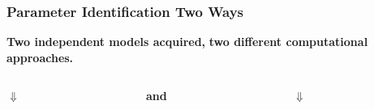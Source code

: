    


		
		
\begin{frame}
    \frametitle{Parameter Identification Two Ways}
    \textbf{Two independent models acquired,}\newline
    \textbf{two different computational approaches.}
    \vspace{1cm}
    \begin{columns}[onlytextwidth]
        \begin{column}{0.4\textwidth}
            \begin{block}{}
            \end{block}
            
            \centering
            $\Downarrow$
            
            \begin{block}{}
            \end{block}
        \end{column}
        
        \begin{column}{0.065\textwidth}
        \textbf{and}
        \end{column}
        
        \begin{column}{0.4\textwidth}
            \begin{exampleblock}{}
            \end{exampleblock}
            
            \centering
            $\Downarrow$
            
            \begin{exampleblock}{}
            \end{exampleblock}
        \end{column}
    \end{columns}
\end{frame}		
		

